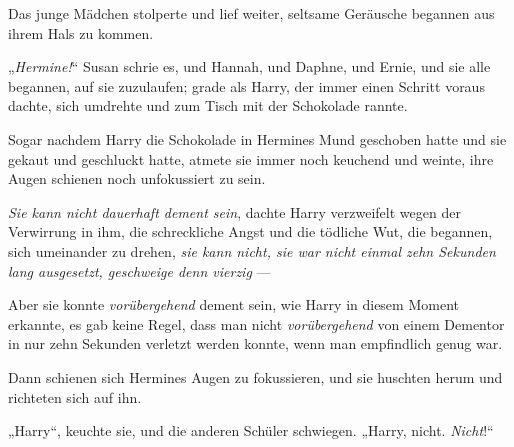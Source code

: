 Das junge Mädchen stolperte und lief weiter, seltsame Geräusche begannen aus ihrem Hals zu kommen.

„\emph{Hermine!}“ Susan schrie es, und Hannah, und Daphne, und Ernie, und sie alle begannen, auf sie zuzulaufen; grade als Harry, der immer einen Schritt voraus dachte, sich umdrehte und zum Tisch mit der Schokolade rannte.

Sogar nachdem Harry die Schokolade in Hermines Mund geschoben hatte und sie gekaut und geschluckt hatte, atmete sie immer noch keuchend und weinte, ihre Augen schienen noch unfokussiert zu sein.

\emph{Sie kann nicht dauerhaft dement sein}, dachte Harry verzweifelt wegen der Verwirrung in ihm, die schreckliche Angst und die tödliche Wut, die begannen, sich umeinander zu drehen, \emph{sie kann nicht, sie war nicht einmal zehn Sekunden lang ausgesetzt, geschweige denn vierzig} —

Aber sie konnte \emph{vorübergehend} dement sein, wie Harry in diesem Moment erkannte, es gab keine Regel, dass man nicht \emph{vorübergehend} von einem Dementor in nur zehn Sekunden verletzt werden konnte, wenn man empfindlich genug war.

Dann schienen sich Hermines Augen zu fokussieren, und sie huschten herum und richteten sich auf ihn.

„Harry“, keuchte sie, und die anderen Schüler schwiegen.
„Harry, nicht. \emph{Nicht}!“

